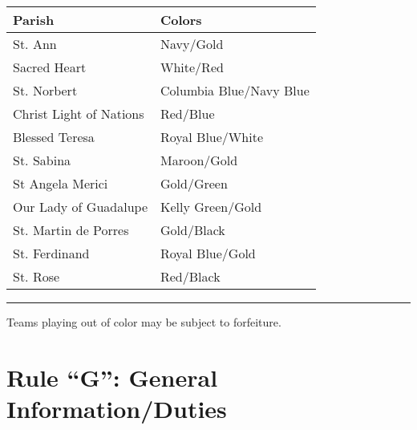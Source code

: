 \begin{center}
    \begin{tabular}{l l}
        Parish & Colors \\
        \hline
        St. Ann & Navy/Gold \\
        Sacred Heart & White/Red \\
        St. Norbert & Columbia Blue/Navy Blue \\
        Christ Light of Nations & Red/Blue \\
        Blessed Teresa & Royal Blue/White \\
        St. Sabina & Maroon/Gold \\
        St Angela Merici & Gold/Green \\
        Our Lady of Guadalupe & Kelly Green/Gold \\
        St. Martin de Porres & Gold/Black \\
        St. Ferdinand & Royal Blue/Gold \\
        St. Rose & Red/Black \\
        \hline
    \end{tabular}
\end{center}
\plainbreak{1}
Teams playing out of color may be subject to forfeiture.
               
\section{Rule ``G'': General Information/Duties}
\label{sec:rules-g}
